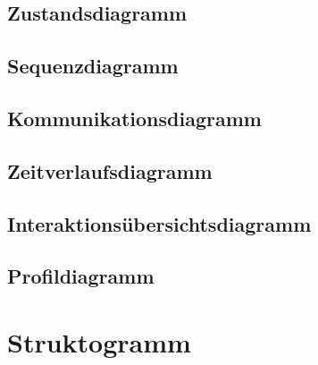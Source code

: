 \subsection{Zustandsdiagramm}

\subsection{Sequenzdiagramm}

\subsection{Kommunikationsdiagramm}

\subsection{Zeitverlaufsdiagramm}

\subsection{Interaktionsübersichtsdiagramm}

\subsection{Profildiagramm}

\section{Struktogramm}